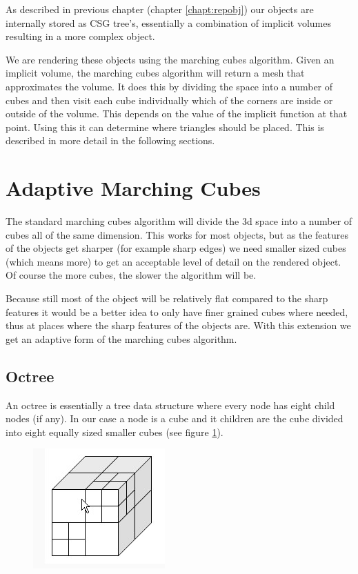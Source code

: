 \documentclass[a4paper,10pt,twoside]{report}
\begin{document}
As described in previous chapter (chapter \ref{chapt:repobj}) our objects are internally stored as CSG tree's, essentially a combination of implicit volumes resulting in a more complex object.

We are rendering these objects using the marching cubes algorithm. Given an implicit volume, the marching cubes algorithm will return a mesh that approximates the volume. It does this by dividing the space into a number of cubes and then visit each cube individually which of the corners are inside or outside of the volume. This depends on the value of the implicit function at that point. Using this it can determine where triangles should be placed. This is described in more detail in the following sections.

\section{Adaptive Marching Cubes}

The standard marching cubes algorithm will divide the 3d space into a number of cubes all of the same dimension. This works for most objects, but as the features of the objects get sharper (for example sharp edges) we need smaller sized cubes (which means more) to get an acceptable level of detail on the rendered object. Of course the more cubes, the slower the algorithm will be.

Because still most of the object will be relatively flat compared to the sharp features it would be a better idea to only have finer grained cubes where needed, thus at places where the sharp features of the objects are. With this extension we get an adaptive form of the marching cubes algorithm.

\subsection{Octree}

An octree is essentially a tree data structure where every node has eight child nodes (if any). In our case a node is a cube and it children are the cube divided into eight equally sized smaller cubes (see figure \ref{figure:octree}).

    \begin{figure}[h]
        \begin{center}
            \includegraphics[scale=0.8]{./images/octree}
        \end{center}
        \caption{}
        \label{figure:octree}
    \end{figure}
\end{document}

